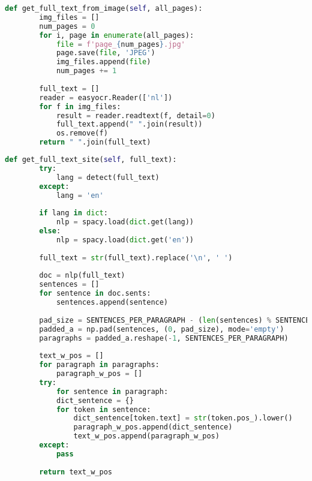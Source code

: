 \begin{lstlisting}[language=Python, caption={Een PDF inlezen met OCR}, label={code:reader-ocr}]
	def get_full_text_from_image(self, all_pages):
		img_files = []
		num_pages = 0
		for i, page in enumerate(all_pages):
			file = f'page_{num_pages}.jpg'
			page.save(file, 'JPEG')
			img_files.append(file)
			num_pages += 1
		
		full_text = []
		reader = easyocr.Reader(['nl'])
		for f in img_files:
			result = reader.readtext(f, detail=0)
			full_text.append(" ".join(result))
			os.remove(f)
		return " ".join(full_text)
\end{lstlisting}

\newpage

\begin{lstlisting}[language=Python, caption={Het formatteren van de tekst naar een formaat voor de website.}, label={code:reader-formatting}]
	def get_full_text_site(self, full_text):
		try:
			lang = detect(full_text)
		except:
			lang = 'en'
	
		if lang in dict:
			nlp = spacy.load(dict.get(lang))
		else:
			nlp = spacy.load(dict.get('en'))
	
		full_text = str(full_text).replace('\n', ' ')
	
		doc = nlp(full_text)
		sentences = []
		for sentence in doc.sents:
			sentences.append(sentence)
	
		pad_size = SENTENCES_PER_PARAGRAPH - (len(sentences) % SENTENCES_PER_PARAGRAPH)
		padded_a = np.pad(sentences, (0, pad_size), mode='empty')
		paragraphs = padded_a.reshape(-1, SENTENCES_PER_PARAGRAPH)
	
		text_w_pos = []
		for paragraph in paragraphs:
			paragraph_w_pos = []
		try:
			for sentence in paragraph:
			dict_sentence = {}
			for token in sentence:
				dict_sentence[token.text] = str(token.pos_).lower()
				paragraph_w_pos.append(dict_sentence)    
				text_w_pos.append(paragraph_w_pos)
		except:
			pass
			
		return text_w_pos
\end{lstlisting}

\newpage

